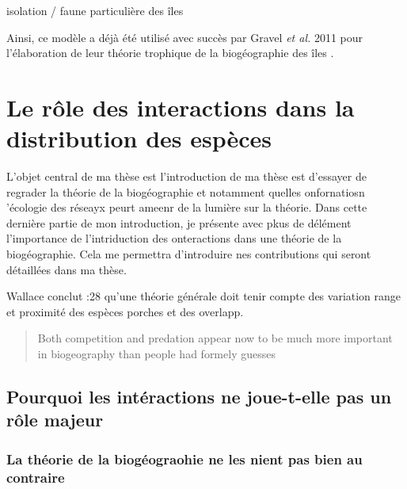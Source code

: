 isolation / faune particulière des îles

Ainsi, ce modèle a déjà été utilisé avec succès par Gravel
\textit{et al.} 2011 pour l'élaboration de leur théorie trophique de la
biogéographie des îles \cite{Gravel2011b}.

\section*{Le rôle des interactions dans la distribution des
espèces}\label{le-ruxf4le-des-interactions-dans-la-distribution-des-espuxe8ces}

L'objet central de ma thèse est l'introduction de ma thèse est d'essayer
de regrader la théorie de la biogéographie et notamment quelles
onfornatiosn 'écologie des réseayx peurt ameenr de la lumière sur la
théorie. Dans cette dernière partie de mon introduction, je présente
avec pkus de délément l'importance de l'intriduction des onteractions
dans une théorie de la biogéographie. Cela me permettra d'introduire nes
contributions qui seront détaillées dans ma thèse.

Wallace conclut :28 qu'une théorie générale doit tenir compte des
variation range et proximité des espèces porches et des overlapp.

\begin{quote}
Both competition and predation appear now to be much more important in
biogeography than people had formely guesses
\end{quote}

\subsection{Pourquoi les intéractions ne joue-t-elle pas un rôle
majeur}\label{pourquoi-les-intuxe9ractions-ne-joue-t-elle-pas-un-ruxf4le-majeur}

\subsubsection{La théorie de la biogéograohie ne les nient pas bien au
contraire}\label{la-thuxe9orie-de-la-bioguxe9ograohie-ne-les-nient-pas-bien-au-contraire}


